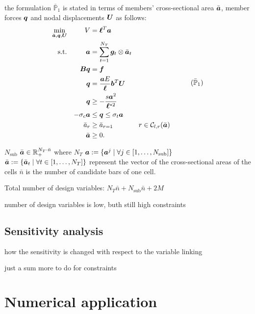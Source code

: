 the formulation $\bar{\mathbb{P}}_\text{1}$ is stated in terms of members' cross-sectional area $\bar{\bm{a}}$, member forces $\bm{q}$ and nodal displacements $\bm{U}$ as follows:
\begin{equation}
    \begin{aligned}
    \min_{\bar{\vect{a}}, \vect{q}, \vect{U}}   && V &= \vect{\ell}^{T}\vect{a}\\
    \textrm{s.t.}  && \vect{a} &= \sum_{t=1}^{N_T} \vect{g}_t\otimes\bar{\vect{a}}_t \\ 
    && \matr{B}\vect{q} &= \vect{f} && \\
    && \vect{q} &= \frac{\vect{a}E}{\vect{\ell}}\vect{b}^T\vect{U} &&  \\
    && \vect{q} &\geq -\frac{s\vect{a}^2}{\vect{\ell}^{*2}} &&  \\
    && -\sigma_c\vect{a} &\leq \vect{q} \leq \sigma_t\vect{a} &&  \\
    && \bar{a}_{r}&\geq \bar{a}_{r=1} && r \in \mathcal{C}_{l,r}(\bar{\vect{a}}) \\
    && \bar{\vect{a}} &\geq 0. \\
    \end{aligned}
    \tag{$\bar{\mathbb{P}}_\text{1}$}
    \label{eq:optim_complete}
\end{equation}

$N_{\text{sub}}$
${\bar{\bm{a}}} \in \mathbb{R}_+^{N_T \cdot \bar{n}} $ where $N_T$
${\bm{a}} :=  \{\bm{a}^j \;|\; \forall j \in [1,\dots,N_{\text{sub}}]\}$
${\bar{\bm{a}}} :=  \{ \bar{\bm{a}}_t \;|\; \forall t \in [1,\dots,N_T]\}$ represent the vector of the cross-sectional areas of the cells
$\bar{n}$ is the number of candidate bars of one cell.

Total number of design variables: $N_T\bar{n} +N_{\text{sub}}\bar{n}+2M$


number of design variables is low, buth still high constraints

\subsection{Sensitivity analysis}
how the sensitivity is changed with respect to the variable linking

just a sum more to do for constraints

\section{Numerical application}

